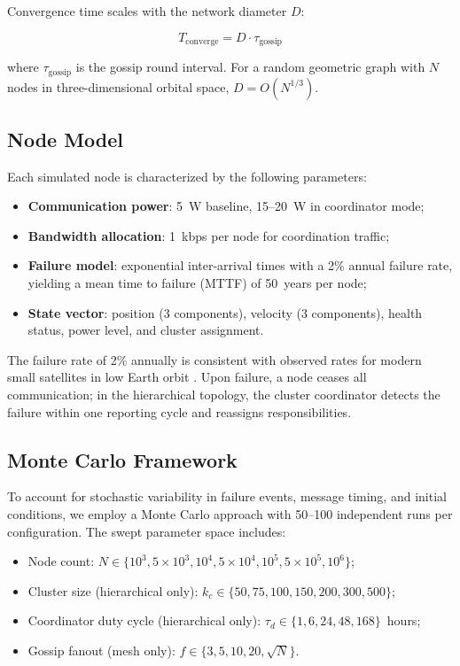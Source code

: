 \documentclass[journal]{IEEEtran}
\begin{document}
Convergence time scales with the network diameter $D$:

\begin{equation}
    T_{\text{converge}} = D \cdot \tau_{\text{gossip}}
    \label{eq:mesh_convergence}
\end{equation}

\noindent where $\tau_{\text{gossip}}$ is the gossip round interval. For a random geometric graph with $N$ nodes in three-dimensional orbital space, $D = O(N^{1/3})$.

\subsection{Node Model}

Each simulated node is characterized by the following parameters:

\begin{itemize}
    \item \textbf{Communication power}: 5~W baseline, 15--20~W in coordinator mode;
    \item \textbf{Bandwidth allocation}: 1~kbps per node for coordination traffic;
    \item \textbf{Failure model}: exponential inter-arrival times with a 2\% annual failure rate, yielding a mean time to failure (MTTF) of 50~years per node;
    \item \textbf{State vector}: position (3 components), velocity (3 components), health status, power level, and cluster assignment.
\end{itemize}

The failure rate of 2\% annually is consistent with observed rates for modern small satellites in low Earth orbit \cite{castet_smallsat_reliability}. Upon failure, a node ceases all communication; in the hierarchical topology, the cluster coordinator detects the failure within one reporting cycle and reassigns responsibilities.

\subsection{Monte Carlo Framework}

To account for stochastic variability in failure events, message timing, and initial conditions, we employ a Monte Carlo approach with 50--100 independent runs per configuration. The swept parameter space includes:

\begin{itemize}
    \item Node count: $N \in \{10^3, 5 \times 10^3, 10^4, 5 \times 10^4, 10^5, 5 \times 10^5, 10^6\}$;
    \item Cluster size (hierarchical only): $k_c \in \{50, 75, 100, 150, 200, 300, 500\}$;
    \item Coordinator duty cycle (hierarchical only): $\tau_d \in \{1, 6, 24, 48, 168\}$~hours;
    \item Gossip fanout (mesh only): $f \in \{3, 5, 10, 20, \sqrt{N}\}$.
\end{itemize}
\end{document}

